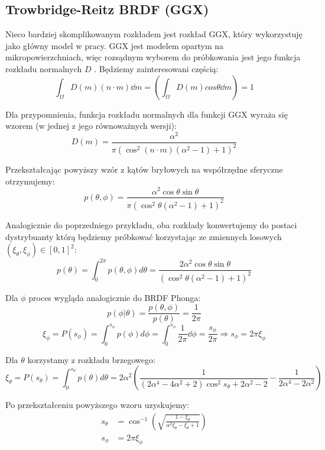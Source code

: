 \documentclass[../main.tex]{subfiles}
\begin{document}
\subsection{Trowbridge-Reitz BRDF (GGX)}

Nieco bardziej skomplikowanym rozkładem jest rozkład GGX, który wykorzystuję jako główny model w pracy. GGX jest modelem opartym na mikropowierzchniach, więc rozsądnym wyborem do próbkowania jest jego funkcja rozkładu normalnych $D$ \cite{NotesImportanceSampling}. Będziemy zainteresowani częścią:
\[
  \int_{\Omega} D(m) (n \cdot m) \dd m = \left(\int_{\Omega} D(m) cos\theta \dd m\right) = 1
\]

Dla przypomnienia, funkcja rozkładu normalnych dla funkcji GGX wyraża się wzorem (w jednej z jego równoważnych wersji):
\[
	D(m) = \frac{
		\alpha^2
	}{
    \pi \left(
      \cos^{2}(n \cdot m)(\alpha^2 - 1) + 1
    \right)^{2}
  }
\]

Przekształcając powyższy wzór z kątów bryłowych na współrzędne sferyczne otrzymujemy:
\[
  p(\theta, \phi) =
	\frac{
    \alpha^2 \cos\theta \sin\theta
	}{
    \pi \left(
      \cos^{2}\theta (\alpha^2 - 1) + 1
    \right)^{2}
  }
\]

Analogicznie do poprzedniego przykładu, oba rozkłady konwertujemy do postaci dystrybuanty którą będziemy próbkować korzystając ze zmiennych losowych $(\xi_{\theta}, \xi_{\phi}) \in [0,1]^2$:
\[
  p(\theta) = \int_{0}^{2\pi} {
    p(\theta, \phi) d \theta
  } =
  \frac{2 \alpha^2 \cos\theta \sin\theta}{
    \left(
      \cos^{2}\theta (\alpha^2 - 1) + 1
    \right)^{2}
  }
\]

Dla $\phi$ proces wygląda analogicznie do BRDF Phonga:
\[
  p(\phi | \theta) = \frac{
    p(\theta, \phi)
	}{
		p(\theta)
	} = \frac{1}{2\pi}
\]
\[
	\xi_\phi = P(s_{\phi}) =
	\int_{0}^{s_{\phi}} {
		p(\phi) d\phi
	} =
	\int_{0}^{s_{\phi}} {
		\frac{1}{2\pi}
        \dd \phi
	} =
	\frac{s_{\phi}}{2\pi}
  \Rightarrow
	s_{\phi} = 2 \pi \xi_{\phi}
\]

Dla $\theta$ korzystamy z rozkładu brzegowego:
\[
  \xi_\theta = P(s_{\theta}) =
	\int_{0}^{s_{\theta}} {
		p(\theta) d\theta
	} =
  2 \alpha^2 \left(
    \frac{1}{
      (2\alpha^4 - 4\alpha^2 + 2) \cos^{2}{s_\theta} + 2\alpha^2 - 2
    } - \frac{1}{
      2\alpha^4 - 2\alpha^2
    }
  \right)
\]

Po przekształceniu powyższego wzoru uzyskujemy:
\begin{align*}
  s_\theta &= \cos^{-1}\left(
    \sqrt{
      \frac{1 - \xi_\theta}{\alpha^2 \xi_\theta - \xi_\theta + 1}
    }
  \right) \\
  s_{\phi} &= 2 \pi \xi_{\phi}
\end{align*}
\end{document}
